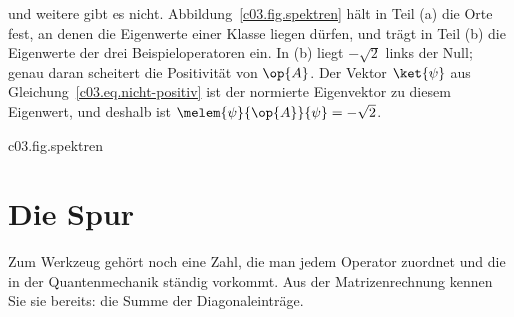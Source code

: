 und weitere gibt es nicht. Abbildung~\ref{c03.fig.spektren} hält in Teil (a) die Orte fest, an
denen die Eigenwerte einer Klasse liegen dürfen, und trägt in Teil (b) die Eigenwerte der drei
Beispieloperatoren ein. In (b) liegt $-\sqrt{2}$ links der Null; genau daran scheitert die
Positivität von $\op{A}$. Der Vektor $\ket{\psi}$ aus Gleichung~\eqref{c03.eq.nicht-positiv} ist
der normierte Eigenvektor zu diesem Eigenwert, und deshalb ist
$\melem{\psi}{\op{A}}{\psi} = -\sqrt{2}$.

\begin{tpcfigure}{c03.fig.spektren}
  \caption{Operatorklassen an ihren Eigenwerten erkannt; das Standbild hat zwei Teile. (a) Wo in der komplexen Ebene die
    Eigenwerte einer Klasse liegen dürfen (Gleichung~\eqref{c03.eq.orte}): hermitesch auf der
    reellen Achse (durchgezogene Linie), positiv auf der Halbachse $\lambda \geq 0$ (breiter
    Streifen), Projektor in den beiden Punkten $0$ und $1$ (gefüllte Punkte), unitär auf dem
    Einheitskreis (gestrichelt). Die Normalität allein lässt jede komplexe Zahl zu. Die
    Verschachtelung Projektor, positiv, hermitesch ist zu sehen: zwei Punkte auf einer
    Halbachse auf einer Geraden. (b) Die Eigenwerte der Operatoren aus
    Beispiel~\ref{c03.ex.drei} (Gleichung~\eqref{c03.eq.spektren}): $\op{A}$ (gefüllte Kreise)
    bei $0$ und $\pm\sqrt{2}$, $\op{B}$ (Ringe) bei $0$ und $1$, $\op{C}$ (Rauten) in drei
    Punkten auf dem Einheitskreis, die ihn in drei gleiche Bögen teilen. Der Eigenwert
    $-\sqrt{2}$ von $\op{A}$ liegt links der Null: $\op{A}$ ist hermitesch, aber nicht
    positiv. Die interaktive Fassung zeigt Orte und Eigenwerte in einer Ebene, für
    $\op{A} + s\Id$, $s\op{B}$, $r\op{C}$ und zwei Operatoren auf $\mathbb{C}^2$, mit einem
    Parameter zum Verschieben und den berechneten Klassentests daneben.}
\end{tpcfigure}

\section{Die Spur}\label{c03.s13}

Zum Werkzeug gehört noch eine Zahl, die man jedem Operator zuordnet und die in der
Quantenmechanik ständig vorkommt. Aus der Matrizenrechnung kennen Sie sie bereits: die Summe der
Diagonaleinträge.

